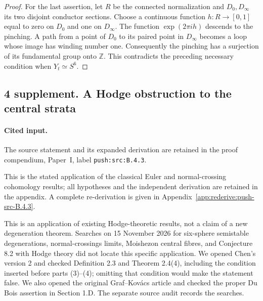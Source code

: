 \begin{proof}
For the last assertion, let $R$ be
the connected normalization and
$D_0,D_\infty$ its two disjoint
conductor sections. Choose a
continuous function $h:R\to[0,1]$
equal to zero on $D_0$ and one on
$D_\infty$. The function
$\exp(2\pi i h)$ descends to the
pinching. A path from a point of
$D_0$ to its paired point in
$D_\infty$ becomes a loop whose
image has winding number one.
Consequently the pinching has a
surjection of its fundamental group
onto $\mathbb Z$. This contradicts
the preceding necessary condition
when $Y_t\simeq S^6$.
\end{proof}

\subsection{4 supplement. A Hodge obstruction to the central strata}


\paragraph{Cited input.} \label{push:src:B.4.3}The source statement and its expanded derivation are retained in the proof compendium, Paper~I, label \nolinkurl{push:src:B.4.3}.\par



This is the stated application of the classical Euler and normal-crossing cohomology results; all hypotheses and the independent derivation are retained in the appendix. A complete re-derivation is given in Appendix~\ref{app:rederive:push-src-B.4.3}.


This is an application of existing Hodge-theoretic results, not
a claim of a new degeneration theorem. Searches on 15 November
2026 for six-sphere semistable degenerations, normal-crossings
limits, Moishezon central fibres, and Conjecture 8.2 with Hodge
theory did not locate this specific application. We opened
Chen's version 2 and checked Definition 2.3
and Theorem 2.4(4), including the condition inserted before
parts (3)--(4); omitting that condition would make the
statement false. We also opened the original Graf--Kov\'acs
article and checked the proper Du Bois assertion in Section
1.D. The separate source audit records the searches.


